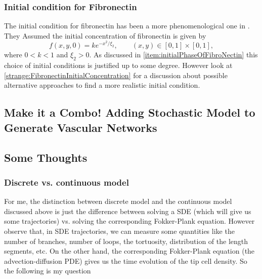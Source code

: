 \subsubsection{Initial condition for Fibronectin}
The initial condition for fibronectin has been a more phenomenological one in \cite{Anderson1998}. They Assumed the initial concentration of fibronectin is given by
\[ f(x,y,0) = k e^{-x^2/\xi_2}, \qquad (x,y) \in [0,1] \times [0,1], \] 
where $ 0<k<1 $ and $ \xi_2 > 0 $. As discussed in \autoref{item:initialPhaseOfFibroNectin} this choice of initial conditions is justified up to some degree. However look at \autoref{strange:FibronectinInitialConcentration} for a discussion about possible alternative approaches to find a more realistic initial condition.



\subsection{Make it a Combo! Adding Stochastic Model to Generate Vascular Networks}

\subsection{Some Thoughts}
\subsubsection{Discrete vs. continuous model}
For me, the distinction between discrete model and the continuous model discussed above is just the difference between solving a SDE (which will give us some trajectories) vs. solving the corresponding Fokker-Plank equation. However observe that, in SDE trajectories, we can measure some quantities like the number of branches, number of loops, the tortuosity, distribution of the length segments, etc. On the other hand, the corresponding Fokker-Plank equation (the advection-diffusion PDE) gives us the time evolution of the tip cell density. So the following is my question

